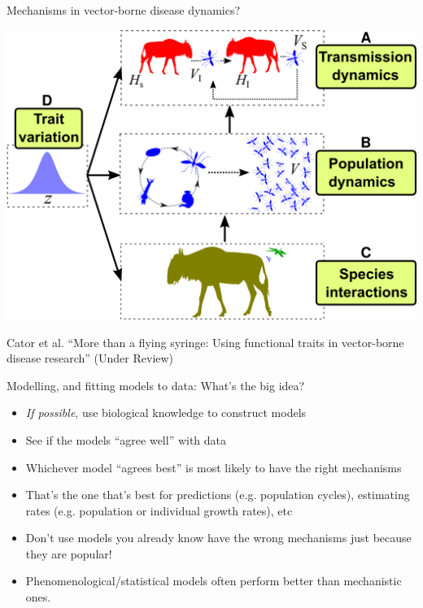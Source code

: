 \documentclass[xcolor=x11names,compress]{beamer}
\renewcommand{\(}{\begin{columns}}
\renewcommand{\)}{\end{columns}}
\newcommand{\<}[1]{\begin{column}{#1}}
\renewcommand{\>}{\end{column}}
\begin{document}
\begin{frame}{Mechanisms in vector-borne disease dynamics?}

	\begin{center}
		\includegraphics[width=.8\textwidth]{VecTraitOverview.png}	
	\end{center}
	
	{\small Cator et al. ``More than a flying syringe: Using functional traits in vector-borne disease research'' (Under Review)}

\end{frame}

	
\begin{frame}{Modelling, and fitting models to data: What's the big idea?}

\begin{itemize} [<+->] \itemsep8pt

	\item {\it If possible}, use biological knowledge to construct models
	\item See if the models ``agree well'' with data
	\item Whichever model ``agrees best'' is most likely to have the right 
	mechanisms
	\item That's the one that's best for predictions (e.g. population 
	cycles), estimating rates (e.g. population or individual growth rates), etc
	\item Don't use models you already know have the wrong mechanisms just because they are popular!
	\item Phenomenological/statistical models often perform better than mechanistic ones.    

\end{itemize}
  
\end{frame}
\end{document}
